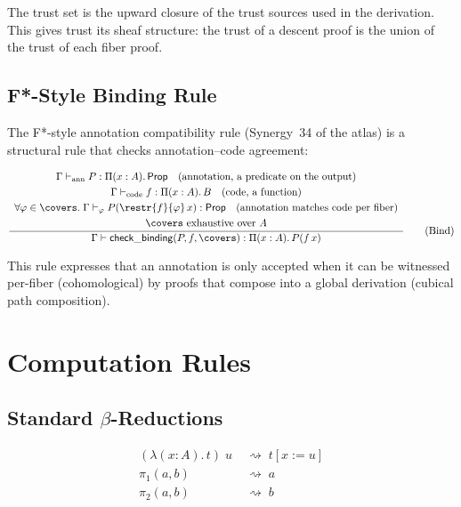 The trust set is the upward closure of the trust sources used in
the derivation.  This gives trust its sheaf structure: the trust of
a descent proof is the union of the trust of each fiber proof.

\subsection{F*-Style Binding Rule}

The F*-style annotation compatibility rule (Synergy~34 of the atlas)
is a structural rule that checks annotation--code agreement:

\begin{gather}
\frac{
  \begin{array}{c}
    \Gamma \vdash_\mathrm{ann} P : \Pi(x : A).\, \mathsf{Prop}
    \quad \text{(annotation, a predicate on the output)}
    \\[3pt]
    \Gamma \vdash_\mathrm{code} f : \Pi(x : A).\, B
    \quad \text{(code, a function)}
    \\[3pt]
    \forall \varphi \in \covers.\;
    \Gamma \vdash_\varphi P(\restr{f}{\varphi}\, x) : \mathsf{Prop}
    \quad \text{(annotation matches code per fiber)}
    \\[3pt]
    \covers \text{ exhaustive over } A
  \end{array}
}
{
  \Gamma \vdash \mathsf{check\_binding}(P, f, \covers) :
  \Pi(x : A).\, P(f\, x)
}
\tag{Bind}
\end{gather}

This rule expresses that an annotation is only accepted when it can
be witnessed per-fiber (cohomological) by proofs that compose into a
global derivation (cubical path composition).


\section{Computation Rules}
\label{sec:computation-rules}

\subsection{Standard \(\beta\)-Reductions}

\begin{align}
  (\lambda(x : A).\, t)\; u
  &\;\rightsquigarrow\; t[x := u]
  \tag{$\beta$}
  \\
  \pi_1(a, b) &\;\rightsquigarrow\; a
  \tag{$\Sigma\beta_1$}
  \\
  \pi_2(a, b) &\;\rightsquigarrow\; b
  \tag{$\Sigma\beta_2$}
\end{align}

